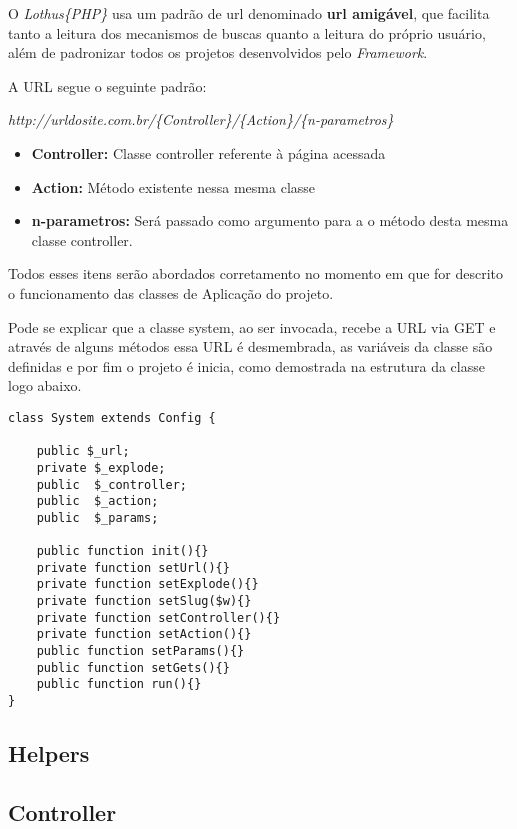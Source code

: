             O \emph{Lothus\{PHP\}} usa um padrão de url denominado \textbf{url amigável}, que facilita tanto a leitura dos mecanismos de buscas quanto a leitura do próprio usuário, além de padronizar todos os projetos desenvolvidos pelo \emph{Framework}.

            A URL segue o seguinte padrão:

            \emph{http://urldosite.com.br/\{Controller\}/\{Action\}/\{n-parametros\}}

            \begin{itemize}
                \item\textbf{Controller:} Classe controller referente à página acessada
                \item\textbf{Action:} Método existente nessa mesma classe
                \item\textbf{n-parametros:} Será passado como argumento para a o método desta mesma classe controller.
            \end{itemize}

            Todos esses itens serão abordados corretamento no momento em que for descrito o funcionamento das classes de Aplicação do projeto.

            Pode se explicar que a classe system, ao ser invocada, recebe a URL via GET e através de alguns métodos essa URL é desmembrada, as variáveis da classe são definidas e por fim o projeto é inicia, como demostrada na estrutura da classe logo abaixo.

\begin{lstlisting}
class System extends Config {

    public $_url;
    private $_explode;
    public  $_controller;
    public  $_action;
    public  $_params;

    public function init(){}
    private function setUrl(){}
    private function setExplode(){}
    private function setSlug($w){}
    private function setController(){}
    private function setAction(){}
    public function setParams(){}
    public function setGets(){}
    public function run(){}
}
\end{lstlisting}




        \subsection{Helpers\label{sub:system-helper}}



        \subsection{Controller\label{sub:system-controller}}


